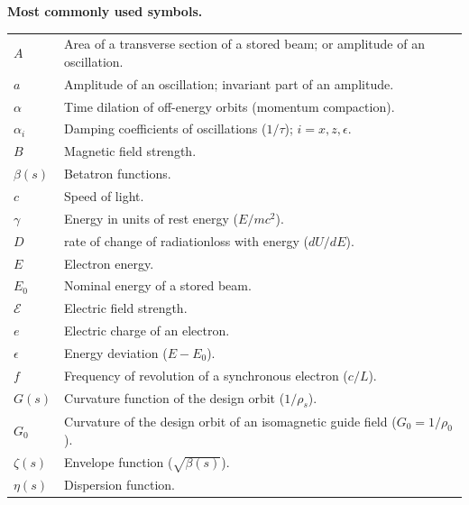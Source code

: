 \documentclass[sands-adaptation.tex]{subfiles}
\begin{document}
\begin{center}
	\textbf{\large Most commonly used symbols.}
\end{center}

\begin{tabularx}{\linewidth}{@{}lX@{}}
	$A$			& Area of a transverse section of a stored beam; or amplitude of an oscillation.\\
	$a$			& Amplitude of an oscillation; invariant part of an amplitude.\\
    $\alpha$	& Time dilation of off-energy orbits (momentum compaction).\\
	$\alpha_i$	& Damping coefficients of oscillations ($1/\tau$); $i = x, z, \epsilon$.\\
    $B$			& Magnetic field strength.\\
	$\beta(s)$	& Betatron functions.\\
	$c$			& Speed of light.\\
	$\gamma$	& Energy in units of rest energy ($E/mc^2$).\\
	$D$			& %
    				rate of change of radiationloss with energy ($dU/dE$).\\
	$E$			& Electron energy.\\
    $E_0$		& Nominal energy of a stored beam.\\
    $\mathscr{E}$ & Electric field strength.\\
    $e$			& Electric charge of an electron.\\
	$\epsilon$	& Energy deviation ($E - E_0$).\\
    $f$			& Frequency of revolution of a synchronous electron ($c/L$).\\
    $G(s)$		& Curvature function of the design orbit ($1/\rho_s$).\\
    $G_0$		& Curvature of the design orbit of an isomagnetic guide field ($G_0 = 1/\rho_0$).\\
	$\zeta(s)$	& Envelope function ($\sqrt{\beta(s)}$).\\
    $\eta(s)$	& Dispersion function.\\

\end{tabularx}
\end{document}
